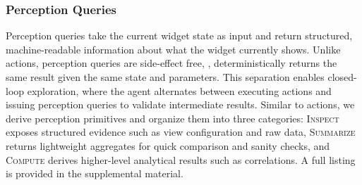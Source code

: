 \subsubsection{Perception Queries}
\label{sec:perception-api}

Perception queries take the current widget state as input and return structured, machine-readable information about what the widget currently shows.
Unlike actions, perception queries are side-effect free, \ie, deterministically returns the same result given the same state and parameters. 
This separation enables closed-loop exploration, where the agent alternates between executing actions and issuing perception queries to validate intermediate results.
Similar to actions, we derive perception primitives and organize them into three categories: \textsc{Inspect} exposes structured evidence such as view configuration and raw data, \textsc{Summarize} returns lightweight aggregates for quick comparison and sanity checks, and \textsc{Compute} derives higher-level analytical results such as correlations.
A full listing is provided in the supplemental material.



